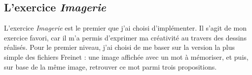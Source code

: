 




\subsection{L'exercice \textit{Imagerie}}
L'exercice \textit{Imagerie} est le premier que j'ai choisi d'implémenter. Il s'agit de mon exercice favori, car il m'a permis d'exprimer ma créativité au travers des dessins réalisés. Pour le premier niveau, j'ai choisi de me baser sur la version la plus simple des fichiers Freinet : une image affichée avec un mot à mémoriser, et puis, sur base de la même image, retrouver ce mot parmi trois propositions.\\

